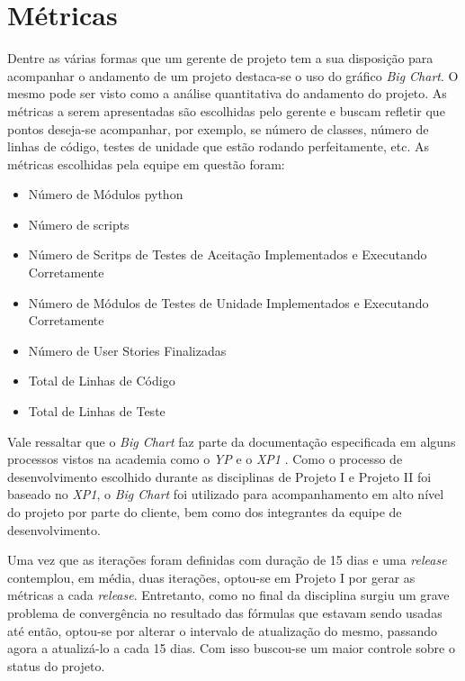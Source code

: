 \chapter{Métricas}

Dentre as várias formas que um gerente de projeto tem a sua disposição para acompanhar o andamento de um 
projeto destaca-se o uso do gráfico \textit{Big Chart}. O mesmo pode ser visto como a análise quantitativa do 
andamento do projeto. As métricas a serem apresentadas são escolhidas pelo gerente e buscam refletir que 
pontos deseja-se acompanhar, por exemplo, se número de classes, número de linhas de código, testes de unidade 
que estão rodando perfeitamente, etc. As métricas escolhidas pela equipe em questão foram:

\begin{itemize}
 \item Número de Módulos python
 \item Número de scripts
 \item Número de Scritps de Testes de Aceitação Implementados e Executando Corretamente
 \item Número de Módulos de Testes de Unidade Implementados e Executando Corretamente
 \item Número de User Stories Finalizadas
 \item Total de Linhas de Código
 \item Total de Linhas de Teste
\end{itemize}


Vale ressaltar que o \textit{Big Chart} faz parte da documentação especificada em alguns processos vistos
 na academia como o \textit{YP} \cite{yp} e o \textit{XP1} \cite{xp1}. Como o processo de desenvolvimento 
escolhido durante as disciplinas de Projeto I e Projeto II foi baseado no \textit{XP1}, o \textit{Big Chart} 
foi utilizado para acompanhamento em alto nível do projeto por parte do cliente, bem como dos integrantes da 
equipe de desenvolvimento.

Uma vez que as iterações foram definidas com duração de 15 dias e uma \textit{release} contemplou, em média, duas 
iterações, optou-se em Projeto I por gerar as métricas a cada \textit{release}. Entretanto, como no final da disciplina 
surgiu um grave problema de convergência no resultado das fórmulas que estavam sendo usadas até então, 
optou-se por alterar o intervalo de atualização do mesmo, passando agora a atualizá-lo a cada 15 dias. Com 
isso buscou-se um maior controle sobre o status do projeto.

